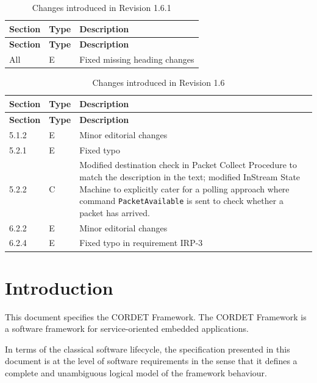 \documentclass[a4paper,10pt]{article}
\let\stdsection\section
\renewcommand\section{\newpage\stdsection}
\begin{document}
\begin{longtable}{|p{1.5cm}|p{1cm}|p{8cm}|}
\caption{Changes introduced in Revision 1.6.1}  \\
\hline
\rowcolor{light-gray}
\textbf{Section} & \textbf{Type} & \textbf{Description} \\
\hline\hline
\endfirsthead
\rowcolor{light-gray}
\textbf{Section} & \textbf{Type} & \textbf{Description} \\
\hline\hline
\endhead
All & E & Fixed missing heading changes \\
\hline
\end{longtable}


\begin{longtable}{|p{1.5cm}|p{1cm}|p{8cm}|}
\caption{Changes introduced in Revision 1.6}  \\
\hline
\rowcolor{light-gray}
\textbf{Section} & \textbf{Type} & \textbf{Description} \\
\hline\hline
\endfirsthead
\rowcolor{light-gray}
\textbf{Section} & \textbf{Type} & \textbf{Description} \\
\hline\hline
\endhead
5.1.2 & E & Minor editorial changes \\
\hline
5.2.1 & E & Fixed typo  \\
\hline
5.2.2 & C & Modified destination check in Packet Collect Procedure to match the description in the text; modified InStream State Machine to explicitly cater for a polling approach where command \texttt{PacketAvailable} is sent to check whether a packet has arrived. \\
\hline
6.2.2 & E & Minor editorial changes  \\
\hline
6.2.4 & E & Fixed typo in requirement IRP-3 \\
\hline
\end{longtable}

\newpage

\section{Introduction}
This document specifies the CORDET Framework. The CORDET Framework is a software framework for service-oriented embedded applications. 

In terms of the classical software lifecycle, the specification presented in this document is at the level of software requirements in the sense that it defines a complete and unambiguous logical model of the framework behaviour.
\end{document}
